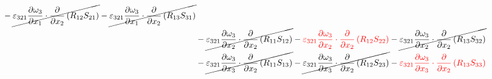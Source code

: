 \begin{equation}
\begin{split}
{}		-\cancel{\varepsilon_{321}\pdv{\omega_{3}}{x_{1}}\cdot\pdv{}{x_{2}}\left(R_{12}S_{21}\right)
}		-\cancel{\varepsilon_{321}\pdv{\omega_{3}}{x_{1}}\cdot\pdv{}{x_{2}}\left(R_{13}S_{31}\right)
}\\ 
		&-\cancel{\varepsilon_{321}\pdv{\omega_{3}}{x_{2}}\cdot\pdv{}{x_{2}}\left(R_{11}S_{12}\right)
}		-{\color{red}\varepsilon_{321}\pdv{\omega_{3}}{x_{2}}\cdot\pdv{}{x_{2}}\left(R_{12}S_{22}\right)
}		-\cancel{\varepsilon_{321}\pdv{\omega_{3}}{x_{2}}\cdot\pdv{}{x_{2}}\left(R_{13}S_{32}\right)
}\\ 
		&-\cancel{\varepsilon_{321}\pdv{\omega_{3}}{x_{3}}\cdot\pdv{}{x_{2}}\left(R_{11}S_{13}\right)
}		-\cancel{\varepsilon_{321}\pdv{\omega_{3}}{x_{3}}\cdot\pdv{}{x_{2}}\left(R_{12}S_{23}\right)
}		-{\color{red}\varepsilon_{321}\pdv{\omega_{3}}{x_{3}}\cdot\pdv{}{x_{2}}\left(R_{13}S_{33}\right)
}\\ 
	\end{split}
\end{equation}
